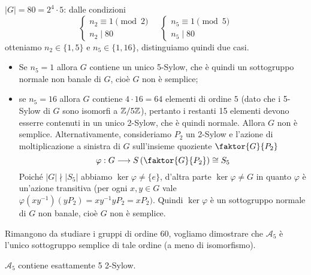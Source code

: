 \documentclass[11pt]{scrartcl}
\begin{document}
\underline{$|G| = 80 = 2^4\cdot 5$}: dalle condizioni
\[
    \begin{cases}
        n_2 \equiv 1 \pmod 2\\
        n_2 \mid 80
    \end{cases}\quad
    \begin{cases}
        n_5 \equiv 1 \pmod 5\\
        n_5 \mid 80
    \end{cases}
\]
otteniamo $n_2 \in \{1, 5\}$ e $n_5 \in \{1, 16\}$, distinguiamo quindi due
casi.
\begin{itemize}
    \item Se $n_5 = 1$ allora $G$ contiene un unico 5-Sylow, che è quindi un
    sottogruppo normale non banale di $G$, cioè $G$ non è semplice;
    \item se $n_5 = 16$ allora $G$ contiene $4\cdot 16 = 64$ elementi di ordine
    $5$ (dato che i 5-Sylow di $G$ sono isomorfi a $\mathbb{Z}/{5}\mathbb{Z}$), pertanto i restanti
    15 elementi devono esserre contenuti in un unico 2-Sylow, che è quindi normale.
    Allora $G$ non è semplice. \newline Alternativamente, consideriamo $P_2$ un 2-Sylow
    e l'azione di moltiplicazione a sinistra di $G$ sull'insieme quoziente $\faktor{G}{P_2}$
    \[
        \varphi: G\longrightarrow S\left(\faktor{G}{P_2}\right) \cong S_5
    \]
    Poiché $|G| \nmid |S_5|$ abbiamo $\ker\varphi\neq\{e\}$, d'altra parte
    $\ker\varphi \neq G$ in quanto $\varphi$ è un'azione transitiva (per 
    ogni $x, y \in G$ vale $\varphi(xy^{-1})(yP_2) = xy^{-1}yP_2 = xP_2)$.
    Quindi $\ker\varphi$ è un sottogruppo normale di $G$ non banale, cioè $G$
    non è semplice. 
\end{itemize}

Rimangono da studiare i gruppi di ordine $60$, vogliamo dimostrare che 
$\mathcal{A}_5$ è l'unico sottogruppo semplice di tale ordine (a meno di isomorfismo).

\begin{lemma}
    $\mathcal{A}_5$ contiene esattamente 5 2-Sylow.
\end{lemma}
\end{document}
